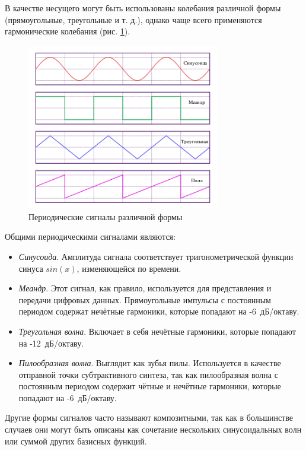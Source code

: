 \documentclass[oneside, final, 14pt]{extreport}
\begin{document}
В качестве несущего могут быть использованы колебания различной формы (прямоугольные, треугольные и т. д.), однако чаще всего применяются гармонические колебания (рис. \ref{pic-modulation-02}).

\begin{figure}[h!]
  \centering
  \includegraphics[width=0.75\textwidth]{pic-modulation-02}
  \caption{Периодические сигналы различной формы}
  \label{pic-modulation-02}
\end{figure}

Общими периодическими сигналами являются:
\begin{itemize}
  \item \textit{Синусоида}. Амплитуда сигнала соответствует тригонометрической функции синуса $sin(x)$, изменяющейся по времени.
  \item \textit{Меандр}. Этот сигнал, как правило, используется для представления и передачи цифровых данных. Прямоугольные импульсы с постоянным периодом содержат нечётные гармоники, которые попадают на -6~дБ/октаву.
  \item \textit{Треугольная волна}. Включает в себя нечётные гармоники, которые попадают на -12~дБ/октаву.
  \item \textit{Пилообразная волна}. Выглядит как зубья пилы. Используется в качестве отправной точки субтрактивного синтеза, так как пилообразная волна с постоянным периодом содержит чётные и нечётные гармоники, которые попадают на -6~дБ/октаву.
\end{itemize}

Другие формы сигналов часто называют композитными, так как в большинстве случаев они могут быть описаны как сочетание нескольких синусоидальных волн или суммой других базисных функций.
\end{document}

